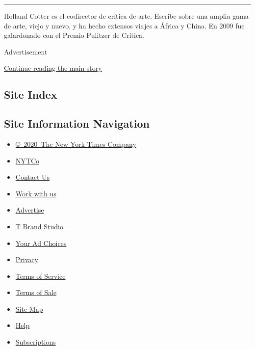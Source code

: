 \begin{center}\rule{0.5\linewidth}{\linethickness}\end{center}

Holland Cotter es el codirector de crítica de arte. Escribe sobre una
amplia gama de arte, viejo y nuevo, y ha hecho extensos viajes a África
y China. En 2009 fue galardonado con el Premio Pulitzer de Crítica.

Advertisement

\protect\hyperlink{after-bottom}{Continue reading the main story}

\hypertarget{site-index}{%
\subsection{Site Index}\label{site-index}}

\hypertarget{site-information-navigation}{%
\subsection{Site Information
Navigation}\label{site-information-navigation}}

\begin{itemize}
\tightlist
\item
  \href{https://help.nytimes3xbfgragh.onion/hc/en-us/articles/115014792127-Copyright-notice}{©~2020~The
  New York Times Company}
\end{itemize}

\begin{itemize}
\tightlist
\item
  \href{https://www.nytco.com/}{NYTCo}
\item
  \href{https://help.nytimes3xbfgragh.onion/hc/en-us/articles/115015385887-Contact-Us}{Contact
  Us}
\item
  \href{https://www.nytco.com/careers/}{Work with us}
\item
  \href{https://nytmediakit.com/}{Advertise}
\item
  \href{http://www.tbrandstudio.com/}{T Brand Studio}
\item
  \href{https://www.nytimes3xbfgragh.onion/privacy/cookie-policy\#how-do-i-manage-trackers}{Your
  Ad Choices}
\item
  \href{https://www.nytimes3xbfgragh.onion/privacy}{Privacy}
\item
  \href{https://help.nytimes3xbfgragh.onion/hc/en-us/articles/115014893428-Terms-of-service}{Terms
  of Service}
\item
  \href{https://help.nytimes3xbfgragh.onion/hc/en-us/articles/115014893968-Terms-of-sale}{Terms
  of Sale}
\item
  \href{https://spiderbites.nytimes3xbfgragh.onion}{Site Map}
\item
  \href{https://help.nytimes3xbfgragh.onion/hc/en-us}{Help}
\item
  \href{https://www.nytimes3xbfgragh.onion/subscription?campaignId=37WXW}{Subscriptions}
\end{itemize}
